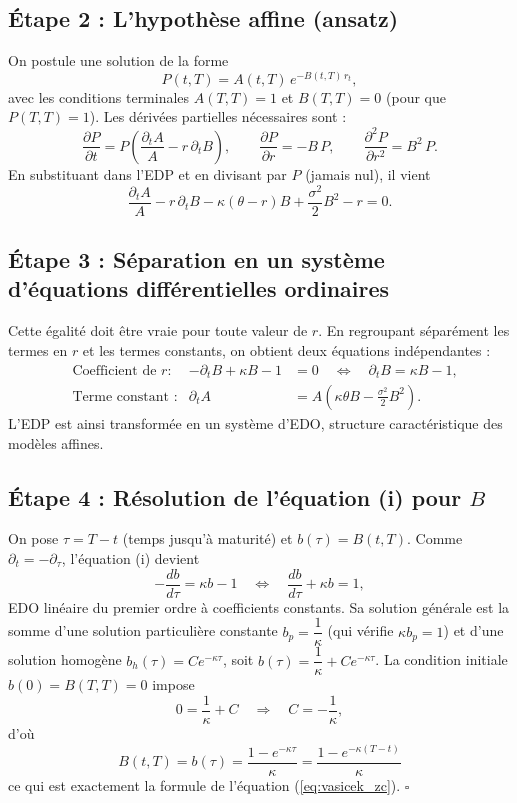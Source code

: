 \subsection*{Étape 2 : L'hypothèse affine (ansatz)}

On postule une solution de la forme
\[
    P(t,T) = A(t,T)\,e^{-B(t,T)\,r_t},
\]
avec les conditions terminales $A(T,T) = 1$ et $B(T,T) = 0$ (pour que $P(T,T)=1$). Les dérivées partielles nécessaires sont :
\[
    \frac{\partial P}{\partial t} = P\!\left(\frac{\partial_t A}{A} - r\,\partial_t B\right),
    \qquad \frac{\partial P}{\partial r} = -B\,P,
    \qquad \frac{\partial^2 P}{\partial r^2} = B^2\,P.
\]
En substituant dans l'EDP et en divisant par $P$ (jamais nul), il vient
\[
    \frac{\partial_t A}{A} - r\,\partial_t B - \kappa(\theta-r)B + \frac{\sigma^2}{2}B^2 - r = 0.
\]

\subsection*{Étape 3 : Séparation en un système d'équations différentielles ordinaires}

Cette égalité doit être vraie pour toute valeur de $r$. En regroupant séparément les termes en $r$ et les termes constants, on obtient deux équations indépendantes :
\begin{align}
    &\text{Coefficient de } r : & -\partial_t B + \kappa B - 1 &= 0
    \quad\Longleftrightarrow\quad \partial_t B = \kappa B - 1, \tag{i}\\[4pt]
    &\text{Terme constant :} & \partial_t A &= A\!\left(\kappa\theta B - \frac{\sigma^2}{2}B^2\right). \tag{ii}
\end{align}
L'EDP est ainsi transformée en un système d'EDO, structure caractéristique des modèles affines.

\subsection*{Étape 4 : Résolution de l'équation (i) pour $B$}

On pose $\tau = T-t$ (temps jusqu'à maturité) et $b(\tau) = B(t,T)$. Comme $\partial_t = -\partial_\tau$, l'équation (i) devient
\[
    -\frac{db}{d\tau} = \kappa b - 1
    \quad\Longleftrightarrow\quad \frac{db}{d\tau} + \kappa b = 1,
\]
EDO linéaire du premier ordre à coefficients constants. Sa solution générale est la somme d'une solution particulière constante $b_p = \dfrac{1}{\kappa}$ (qui vérifie $\kappa b_p = 1$) et d'une solution homogène $b_h(\tau) = Ce^{-\kappa\tau}$, soit $b(\tau) = \dfrac{1}{\kappa} + Ce^{-\kappa\tau}$. La condition initiale $b(0) = B(T,T) = 0$ impose
\[
    0 = \frac{1}{\kappa} + C \quad\Longrightarrow\quad C = -\frac{1}{\kappa},
\]
d'où
\[
    \boxed{\,B(t,T) = b(\tau) = \frac{1-e^{-\kappa\tau}}{\kappa} = \frac{1-e^{-\kappa(T-t)}}{\kappa}\,}
\]
ce qui est exactement la formule de l'équation (\ref{eq:vasicek_zc}). \hfill$\square$

